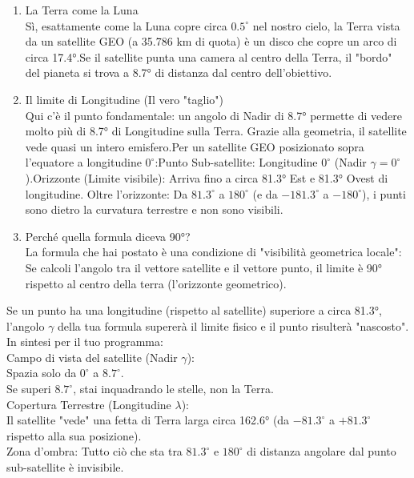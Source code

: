 \documentclass[a4paper,14pt]{article}
\begin{document}
\begin{enumerate}
\item La Terra come la Luna\\
Sì, esattamente come la Luna copre circa \(0.5^{\circ }\) nel nostro cielo, la Terra vista da un satellite GEO (a 35.786 km di quota) è un disco che copre un arco di circa 17.4°.Se il satellite punta una camera al centro della Terra, il "bordo" del pianeta si trova a 8.7° di distanza dal centro dell'obiettivo.
\item Il limite di Longitudine (Il vero "taglio")\\
Qui c'è il punto fondamentale: un angolo di Nadir di 8.7° permette di vedere molto più di 8.7° di Longitudine sulla Terra. Grazie alla geometria, il satellite vede quasi un intero emisfero.Per un satellite GEO posizionato sopra l'equatore a longitudine \(0^{\circ }\):Punto Sub-satellite: Longitudine \(0^{\circ }\) (Nadir \(\gamma =0^{\circ }\)).Orizzonte (Limite visibile): Arriva fino a circa 81.3° Est e 81.3° Ovest di longitudine.
Oltre l'orizzonte: Da \(81.3^{\circ }\) a \(180^{\circ }\) (e da \(-181.3^{\circ }\) a \(-180^{\circ }\)), i punti sono dietro la curvatura terrestre e non sono visibili.
\item Perché quella formula diceva 90°?\\
La formula che hai postato è una condizione di "visibilità geometrica locale": Se calcoli l'angolo tra il vettore satellite e il vettore punto, il limite è 90° rispetto al centro della terra (l'orizzonte geometrico).
\end{enumerate}
Se un punto ha una longitudine (rispetto al satellite) superiore a circa 81.3°, l'angolo \(\gamma \) della tua formula supererà il limite fisico e il punto risulterà "nascosto". \\
In sintesi per il tuo programma:\\
Campo di vista del satellite (Nadir \(\gamma \)):\\
Spazia solo da \(0^{\circ }\) a \(8.7^{\circ }\).\\
Se superi \(8.7^{\circ }\), stai inquadrando le stelle, non la Terra.\\
Copertura Terrestre (Longitudine \(\lambda \)):\\
Il satellite "vede" una fetta di Terra larga circa 162.6° (da \(-81.3^{\circ }\) a \(+81.3^{\circ }\) rispetto alla sua posizione).\\
Zona d'ombra: Tutto ciò che sta tra \(81.3^{\circ }\) e \(180^{\circ }\) di distanza angolare dal punto sub-satellite è invisibile.\\
\end{document}
